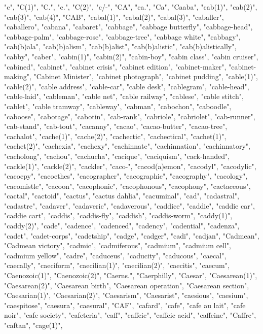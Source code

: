 "c",
"C(1)",
"C.",
"c.",
"C(2)",
"c/-",
"CA",
"ca.",
"Ca",
"Caaba",
"cab(1)",
"cab(2)",
"cab(3)",
"cab(4)",
"CAB",
"cabal(1)",
"cabal(2)",
"cabal(3)",
"caballer",
"caballero",
"cabana",
"cabaret",
"cabbage",
"cabbage butterfly",
"cabbage-head",
"cabbage-palm",
"cabbage-rose",
"cabbage-tree",
"cabbage white",
"cabbagy",
"cab(b)ala",
"cab(b)alism",
"cab(b)alist",
"cab(b)alistic",
"cab(b)alistically",
"cabby",
"caber",
"cabin(1)",
"cabin(2)",
"cabin-boy",
"cabin class",
"cabin cruiser",
"cabined",
"cabinet",
"cabinet crisis",
"cabinet edition",
"cabinet-maker",
"cabinet-making",
"Cabinet Minister",
"cabinet photograph",
"cabinet pudding",
"cable(1)",
"cable(2)",
"cable address",
"cable-car",
"cable desk",
"cablegram",
"cable-head",
"cable-laid",
"cableman",
"cable net",
"cable railway",
"cablese",
"cable stitch",
"cablet",
"cable tramway",
"cableway",
"cabman",
"cabochon",
"caboodle",
"caboose",
"cabotage",
"cabotin",
"cab-rank",
"cabriole",
"cabriolet",
"cab-runner",
"cab-stand",
"cab-tout",
"cacanny",
"cacao",
"cacao-butter",
"cacao-tree",
"cachalot",
"cache(1)",
"cache(2)",
"cachectic",
"cachectical",
"cachet(1)",
"cachet(2)",
"cachexia",
"cachexy",
"cachinnate",
"cachinnation",
"cachinnatory",
"cacholong",
"cachou",
"cachucha",
"cacique",
"caciquism",
"cack-handed",
"cackle(1)",
"cackle(2)",
"cackler",
"caco-",
"cacod(a)emon",
"cacodyl",
"cacodylic",
"cacoepy",
"cacoethes",
"cacographer",
"cacographic",
"cacography",
"cacology",
"cacomistle",
"cacoon",
"cacophonic",
"cacophonous",
"cacophony",
"cactaceous",
"cactal",
"cactoid",
"cactus",
"cactus dahlia",
"cacuminal",
"cad",
"cadastral",
"cadastre",
"cadaver",
"cadaveric",
"cadaverous",
"caddice",
"caddie",
"caddie car",
"caddie cart",
"caddis",
"caddis-fly",
"caddish",
"caddis-worm",
"caddy(1)",
"caddy(2)",
"cade",
"cadence",
"cadenced",
"cadency",
"cadential",
"cadenza",
"cadet",
"cadet-corps",
"cadetship",
"cadge",
"cadger",
"cadi",
"cadjan",
"Cadmean",
"Cadmean victory",
"cadmic",
"cadmiferous",
"cadmium",
"cadmium cell",
"cadmium yellow",
"cadre",
"caduceus",
"caducity",
"caducous",
"caecal",
"caecally",
"caeciform",
"caecilian(1)",
"caecilian(2)",
"caecitis",
"caecum",
"Caenozoic(1)",
"Caenozoic(2)",
"Caerns.",
"Caerphilly",
"Caesar",
"Caesarean(1)",
"Caesarean(2)",
"Caesarean birth",
"Caesarean operation",
"Caesarean section",
"Caesarian(1)",
"Caesarian(2)",
"Caesarism",
"Caesarist",
"caesious",
"caesium",
"caespitose",
"caesura",
"caesural",
"CAF",
"cafard",
"cafe",
"cafe au lait",
"cafe noir",
"cafe society",
"cafeteria",
"caff",
"caffeic",
"caffeic acid",
"caffeine",
"Caffre",
"caftan",
"cage(1)",
